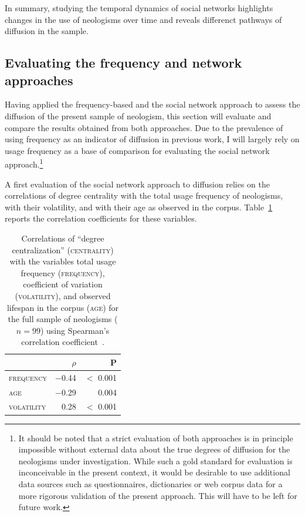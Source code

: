 \documentclass[
  a4paper,
  abstract=on,
  captions=tableabove
  ]{scrartcl}
\begin{document}
      In summary, studying the temporal dynamics of social networks highlights changes in the use of neologisms over time and reveals differenct pathways of diffusion in the sample.


  \subsection{Evaluating the frequency and network approaches}
    \label{subsec:nets-vs-freq}

    Having applied the frequency-based and the social network approach to assess the diffusion of the present sample of neologism, this section will evaluate and compare the results obtained from both approaches. Due to the prevalence of using frequency as an indicator of diffusion in previous work, I will largely rely on usage frequency as a base of comparison for evaluating the social network approach.\footnote{It should be noted that a strict evaluation of both approaches is in principle impossible without external data about the true degrees of diffusion for the neologisms under investigation. While such a gold standard for evaluation is inconceivable in the present context, it would be desirable to use additional data sources such as questionnaires, dictionaries or web corpus data for a more rigorous validation of the present approach. This will have to be left for future work.}

    A first evaluation of the social network approach to diffusion relies on the correlations of degree centrality with the total usage frequency of neologisms, with their volatility, and with their age as observed in the corpus. Table~\ref{tab:correlations} reports the correlation coefficients for these variables.

    \begin{table}
      \centering
      \caption[Correlation matrix for \textsc{centrality}]{Correlations of \enquote{degree centralization} (\textsc{centrality}) with the variables total usage frequency (\textsc{frequency}), coefficient of variation (\textsc{volatility}), and observed lifespan in the corpus (\textsc{age}) for the full sample of neologisms ($n=99$) using Spearman's correlation coefficient~\parencite{Spearman1961ProofMeasurement}.\protect\footnotemark{}}
      \label{tab:correlations}
      \begin{tabular}{>{\scshape}l r r}
        \toprule
                    & {$\rho$}    & P               \\
        \midrule
        frequency  & \num{-0.44} & $<$ \num{0.001} \\
        age        & \num{-0.29} & \num{0.004}     \\
        volatility & \num{0.28}  & $<$ \num{0.001} \\
        \bottomrule
      \end{tabular}
    \end{table}
\end{document}
